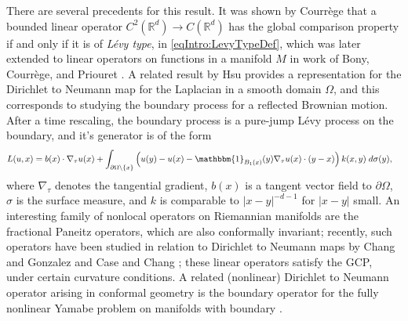 \documentclass[11pt,reqno]{amsart}
\numberwithin{equation}{section}
\theoremstyle{plain}
\def\real{{\mathbb R}}
\def\Indicator{{\mathbbm{1}}}
\newcommand{\abs}[1]{\left| #1 \right|}
\begin{document}
There are several precedents for this result. It was shown by Courr\`ege \cite{Courrege-1965formePrincipeMaximum} that a bounded linear operator $C^2(\real^d)\to C(\real^d)$ has the global comparison property if and only if it is of \emph{L\'evy type}, in \eqref{eqIntro:LevyTypeDef}, which was later extended to linear operators on functions in a manifold $M$ in work of Bony, Courr\`ege, and Priouret \cite{BonyCourregePriouret-1966FellerSemiGroupOnDifferentialVariety}. A related result by Hsu \cite{Hsu-1986ExcursionsReflectingBM} provides a representation for the Dirichlet to Neumann map for the Laplacian in a smooth domain $\Omega$, and this corresponds to studying the boundary process for a reflected Brownian motion.  After a time rescaling, the boundary process is a pure-jump L\'evy process on the boundary, and it's generator is of the form
\begin{align*}
  L(u,x) & = b(x)\cdot \nabla_{\tau} u(x)+\int_{\partial \Omega \setminus \{x\}} \left ( u(y)-u(x) -\Indicator_{B_1(x)}(y)\nabla_\tau u(x)\cdot (y-x)\right ) k(x,y)\;d\sigma(y), 
\end{align*}
where $\nabla_\tau$ denotes the tangential gradient, $b(x)$ is a tangent vector field to $\partial \Omega$, $\sigma$ is the surface measure, and $k$ is comparable to $\abs{x-y}^{-d-1}$ for $\abs{x-y}$ small. An interesting family of nonlocal operators on Riemannian manifolds are the fractional Paneitz operators, which are also conformally invariant; recently, such operators have been studied in relation to Dirichlet to Neumann maps by Chang and Gonzalez \cite{ChGo-2011FracLaplaceGeometry} and Case and Chang \cite{CaseChang2016fractionalGJMS}; these linear operators satisfy the GCP, under certain curvature conditions. A related (nonlinear) Dirichlet to Neumann operator arising in conformal geometry is the boundary operator for the fully nonlinear Yamabe problem on manifolds with boundary \cite{LiLi2006FullyYamabeBoundary}.
\end{document}
